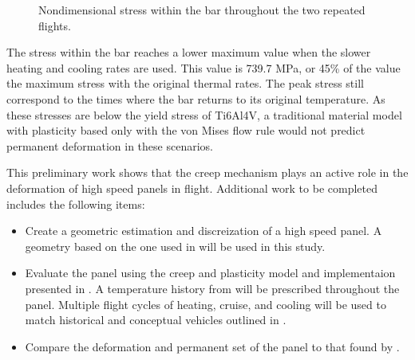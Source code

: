 \documentclass[conf]{new-aiaa}
\begin{document}
\begin{figure}[H]
  \centering
  \caption{ Nondimensional stress within the bar throughout the two repeated flights.}
  \label{fig_slow_full_nondim_stress}
\end{figure}

The stress within the bar reaches a lower maximum value 
when the slower heating and cooling rates are used.
This value is 739.7 MPa, or 45\% of the value
the maximum stress with the original thermal rates.
The peak stress still correspond to the times where
the bar returns to its original temperature.
As these stresses are below the yield stress of Ti6Al4V, 
a traditional material model with plasticity based only with the
von Mises flow rule would not predict permanent deformation 
in these scenarios.


This preliminary work shows that the creep mechanism plays 
an active role in the deformation of high speed panels in flight.
Additional work to be completed includes the following items:

\begin{itemize}
  \item Create a geometric estimation and discreization of a high speed panel.
        A geometry based on the one used in 
        \cite{ culler_impact_of_FTS_coupling_on_response_prediction_hypersonic_skin_panels}
        will be used in this study.
  \item Evaluate the panel using the creep and plasticity model and implementaion presented in
        \cite{ li_simulation_of_finite_strain_inelastic_phenomena_governed_by_creep_and_plasticity}.
        A temperature history from 
        \cite{ culler_impact_of_FTS_coupling_on_response_prediction_hypersonic_skin_panels}
        will be prescribed throughout the panel. 
        Multiple flight cycles of heating, cruise, and cooling will be used
        to match historical and conceptual vehicles outlined in
        \cite{ kordes_structureal_heating_experiencs_on_the_x15_airplane,
               zuchowski_AVIATR_Predictive_capability_for_hypersonic_structural_response_and_life_prediction_phase_II}.
  \item Compare the deformation and permanent set of the panel to that 
        found by \cite{ culler_impact_of_FTS_coupling_on_response_prediction_hypersonic_skin_panels}.
\end{itemize}
\end{document}
